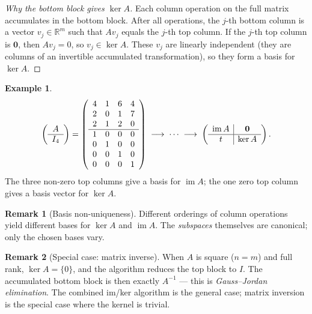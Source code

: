 \documentclass[11pt]{article}
\theoremstyle{definition}
\newtheorem{example}{Example}[section]
\newtheorem{remark}{Remark}[section]
\theoremstyle{plain}
\begin{document}
\begin{proof}[Why the bottom block gives $\ker A$]
  Each column operation on the full matrix accumulates in the bottom block.
  After all operations, the $j$-th bottom column is a vector $v_j\in\mathbb{R}^m$
  such that $Av_j$ equals the $j$-th top column.
  If the $j$-th top column is $\mathbf{0}$, then $Av_j = 0$, so
  $v_j \in \ker A$.
  These $v_j$ are linearly independent (they are columns of an invertible
  accumulated transformation), so they form a basis for $\ker A$.
\end{proof}

\begin{example}
\[
  \left(\begin{array}{c} A \\ \hline I_4 \end{array}\right)
  =
  \left(\begin{array}{cccc}
    4&1&6&4\\2&0&1&7\\2&1&2&0\\\hline
    1&0&0&0\\0&1&0&0\\0&0&1&0\\0&0&0&1
  \end{array}\right)
  \;\longrightarrow\;\cdots\;\longrightarrow\;
  \left(\begin{array}{cc|cc}
    \multicolumn{2}{c|}{\operatorname{im}A} & \multicolumn{2}{c}{\mathbf{0}}\\
    \hline
    \multicolumn{2}{c|}{t} & \multicolumn{2}{c}{\ker A}
  \end{array}\right).
\]
The three non-zero top columns give a basis for $\operatorname{im}A$;
the one zero top column gives a basis vector for $\ker A$.
\end{example}

\begin{remark}[Basis non-uniqueness]
  Different orderings of column operations yield different bases for
  $\ker A$ and $\operatorname{im} A$.
  The \emph{subspaces} themselves are canonical; only the chosen bases vary.
\end{remark}

\begin{remark}[Special case: matrix inverse]
  When $A$ is square ($n=m$) and full rank, $\ker A = \{0\}$, and the
  algorithm reduces the top block to $I$.
  The accumulated bottom block is then exactly $A^{-1}$ — this is
  \emph{Gauss--Jordan elimination}.
  The combined im/ker algorithm is the general case; matrix inversion is
  the special case where the kernel is trivial.
\end{remark}
\end{document}
